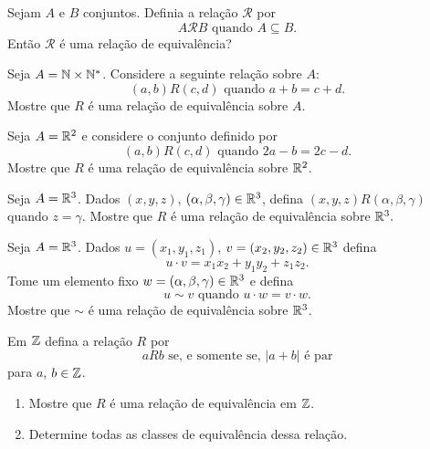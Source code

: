 \documentclass[12pt]{exam}
\begin{document}
    \questao{} Sejam $A$ e $B$ conjuntos. Definia a rela{\c c}\~ao $\mathcal{R}$ por
    \[
        A \mathcal{R} B \mbox{ quando } A \subseteq B.
    \]
    Ent\~ao $\mathcal{R}$ \'e uma rela{\c c}\~ao de equival\^encia?

    \vspace{.3cm}

    \questao{} Seja $A = \mathbb{N} \times \mathbb{N}^*$. Considere a seguinte
    rela{\c c}{\~a}o sobre $A$:
    \[
        (a,b) R (c,d) \mbox{ quando } a + b = c + d.
    \]
    Mostre que $R$ {\'e} uma rela{\c c}{\~a}o de equival{\^e}ncia sobre $A$.

    \vspace{.3cm}

    \questao{} Seja $A = \mathbb{R}^2$ e considere o conjunto definido por
    \[
      (a,b)R(c,d) \mbox{ quando } 2a - b = 2c - d.
    \]
    Mostre que $R$ \'e uma rela\c{c}\~ao de equival\^encia sobre $\mathbb{R}^2$.

    \vspace{.3cm}

    \questao{} Seja $A = \mathbb{R}^3$. Dados $(x, y, z)$, $(\alpha, \beta, \gamma) \in \mathbb{R}^3$, defina $(x, y, z) R (\alpha, \beta, \gamma)$ quando $z = \gamma$. Mostre que $R$ \'e uma rela\c{c}\~ao de equival\^encia sobre $\mathbb{R}^3.$

    \vspace{.3cm}

    \questao{} Seja $A = \mathbb{R}^3$. Dados $u = (x_1, y_1, z_1)$, $v = (x_2, y_2, z_2) \in \mathbb{R}^3$ defina
    \[
        u\cdot v = x_1x_2 + y_1y_2 + z_1z_2.
    \]
    Tome um elemento fixo $w = (\alpha, \beta, \gamma) \in \mathbb{R}^3$ e defina
    \[
        u \sim v \mbox{ quando } u \cdot w = v \cdot w.
    \]
    Mostre que $\sim$ \'e uma rela\c{c}\~ao de equival\^encia sobre $\mathbb{R}^3$.

    \vspace{.3cm}

    \questao{} Em $\mathbb{Z}$ defina a relação $R$ por
    \[
        a R b \mbox{ se, e somente se, } |a + b| \mbox{ é par}
    \]
    para $a$, $b \in \mathbb{Z}$.
    \begin{enumerate}[label={\alph*})]
        \item Mostre que $R$ é uma relação de equivalência em $\mathbb{Z}$.

        \item Determine todas as classes de equivalência dessa relação.
    \end{enumerate}

    \vspace{.3cm}
\end{document}
